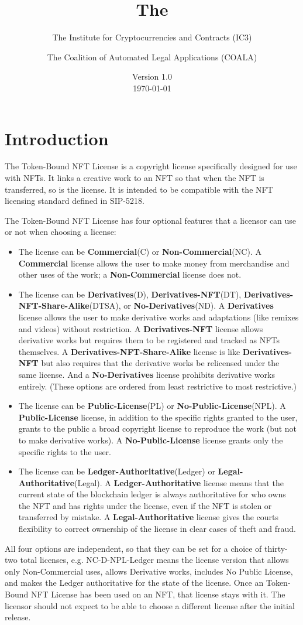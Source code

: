 \documentclass{article}
\title{The \iccclicense\\}
\author{The Institute for Cryptocurrencies and Contracts (IC3) \and The Coalition of Automated Legal Applications (COALA)}
\date{Version 1.0\\\today}
\newcommand{\eiplicense}{SIP-5218\xspace}
\newcommand{\iccclicense}{Token-Bound NFT License\xspace}
\newcommand{\keyword}[1]{\textbf{#1}\xspace}
\newcommand{\publiclicense}{\keyword{Public-License}}
\newcommand{\nopubliclicense}{\keyword{No-Public-License}}
\newcommand{\commercial}{\keyword{Commercial}}
\newcommand{\noncommercial}{\keyword{Non-Commercial}}
\newcommand{\noderivative}{\keyword{No-Derivatives}}
\newcommand{\derivative}{\keyword{Derivatives}}
\newcommand{\derivativetracking}{\keyword{Derivatives-NFT}}
\newcommand{\sharealike}{\keyword{Derivatives-NFT-Share-Alike}}
\newcommand{\ledger}{\keyword{Ledger-Authoritative}}
\newcommand{\legal}{\keyword{Legal-Authoritative}}
\begin{document}
\maketitle

\tableofcontents

\section{Introduction}

The \iccclicense is a copyright license specifically designed for use with NFTs. It links a creative work to an NFT so that when the NFT is transferred, so is the license. It is intended to be compatible with the NFT licensing standard defined in \eiplicense. 

The \iccclicense has four optional features that a licensor can use or not when choosing a license:
\begin{itemize}
\item The license can be \commercial (C) or \noncommercial (NC). A \commercial license allows the user to make money from merchandise and other uses of the work; a \noncommercial license does not.
\item The license can be \derivative (D), \derivativetracking (DT), \sharealike (DTSA), or \noderivative (ND). A \derivative license allows the user to make derivative works and adaptations (like remixes and videos) without restriction. A \derivativetracking license allows derivative works but requires them to be registered and tracked as NFTs themselves. A \sharealike license is like \derivativetracking but also requires that the derivative works be relicensed under the same license. And a \noderivative license prohibits derivative works entirely. (These options are ordered from least restrictive to most restrictive.)
\item The license can be \publiclicense (PL) or \nopubliclicense (NPL). A \publiclicense license, in addition to the specific rights granted to the user, grants to the public a broad copyright license to reproduce the work (but not to make derivative works). A \nopubliclicense license grants only the specific rights to the user.
\item The license can be \ledger (Ledger) or \legal (Legal). A \ledger license means that the current state of the blockchain ledger is always authoritative for who owns the NFT and has rights under the license, even if the NFT is stolen or transferred by mistake. A \legal license gives the courts flexibility to correct ownership of the license in clear cases of theft and fraud. 
\end{itemize}
All four options are independent, so that they can be set for a choice of thirty-two total licenses, e.g. NC-D-NPL-Ledger means the license version that allows only Non-Commercial uses, allows Derivative works, includes No Public License, and makes the Ledger authoritative for the state of the license. Once an \iccclicense has been used on an NFT, that license stays with it. The licensor should not expect to be able to choose a different license after the initial release.
\end{document}
